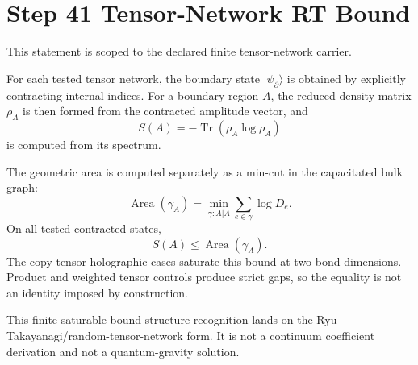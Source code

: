 \documentclass[11pt]{article}
\begin{document}
\section*{Step 41 Tensor-Network RT Bound}
This statement is scoped to the declared finite tensor-network carrier.

For each tested tensor network, the boundary state \(|\psi_{\partial}\rangle\) is obtained by explicitly contracting internal indices. For a boundary region \(A\), the reduced density matrix \(\rho_A\) is then formed from the contracted amplitude vector, and
\[
  S(A)=-\operatorname{Tr}(\rho_A\log\rho_A)
\]
is computed from its spectrum.

The geometric area is computed separately as a min-cut in the capacitated bulk graph:
\[
  \operatorname{Area}(\gamma_A)=\min_{\gamma:A|\bar A}\sum_{e\in\gamma} \log D_e.
\]
On all tested contracted states,
\[
  S(A)\le \operatorname{Area}(\gamma_A).
\]
The copy-tensor holographic cases saturate this bound at two bond dimensions. Product and weighted tensor controls produce strict gaps, so the equality is not an identity imposed by construction.

This finite saturable-bound structure recognition-lands on the Ryu--Takayanagi/random-tensor-network form. It is not a continuum coefficient derivation and not a quantum-gravity solution.
\end{document}

